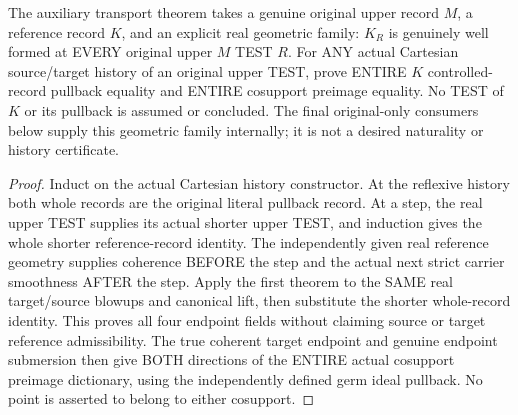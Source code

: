 \begin{theorem}
\label{hir:original-untested-modeled-controlled-smooth-history}
\leanok
The auxiliary transport theorem takes a genuine original upper record
$M$, a reference record $K$, and an explicit real geometric family:
$K_R$ is genuinely well formed at EVERY original upper $M$ TEST $R$.
For ANY actual Cartesian source/target history of an original upper TEST,
prove ENTIRE $K$ controlled-record pullback equality and ENTIRE cosupport
preimage equality. No TEST of $K$ or its pullback is assumed or concluded.
The final original-only consumers below supply this geometric family
internally; it is not a desired naturality or history certificate.
\end{theorem}
\begin{proof}
Induct on the actual Cartesian history constructor. At the reflexive
history both whole records are the original literal pullback record.
At a step, the real upper TEST supplies its actual shorter upper TEST,
and induction gives the whole shorter reference-record identity. The
independently given real reference geometry supplies coherence BEFORE
the step and the actual next strict carrier smoothness AFTER the step.
Apply the first theorem to the SAME real target/source blowups and
canonical lift, then substitute the shorter whole-record identity.
This proves all four endpoint fields without claiming source or target
reference admissibility. The true coherent target endpoint and genuine
endpoint submersion then give BOTH directions of the ENTIRE actual
cosupport preimage dictionary, using the independently defined germ
ideal pullback. No point is asserted to belong to either cosupport.
\end{proof}

